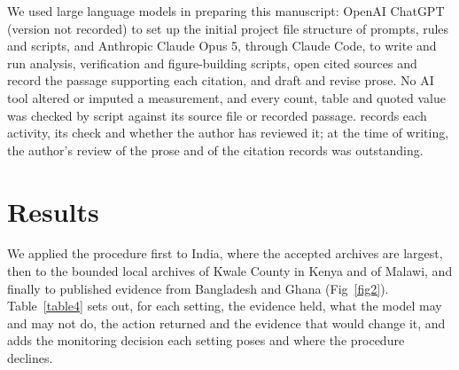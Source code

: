 \documentclass[10pt,letterpaper]{article}
\begin{document}
We used large language models in preparing this manuscript: OpenAI ChatGPT (version not recorded) to set up the initial project file structure of prompts, rules and scripts, and Anthropic Claude Opus 5, through Claude Code, to write and run analysis, verification and figure-building scripts, open cited sources and record the passage supporting each citation, and draft and revise prose. No AI tool altered or imputed a measurement, and every count, table and quoted value was checked by script against its source file or recorded passage.  records each activity, its check and whether the author has reviewed it; at the time of writing, the author's review of the prose and of the citation records was outstanding.

\section*{Results}

We applied the procedure first to India, where the accepted archives are largest, then to the bounded local archives of Kwale County in Kenya and of Malawi, and finally to published evidence from Bangladesh and Ghana (Fig~\ref{fig2}). Table~\ref{table4} sets out, for each setting, the evidence held, what the model may and may not do, the action returned and the evidence that would change it, and  adds the monitoring decision each setting poses and where the procedure declines.
\end{document}
